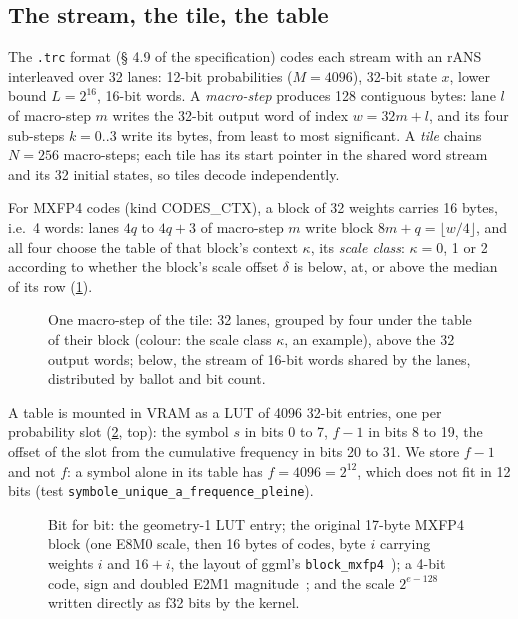 \subsection{The stream, the tile, the table}

The \texttt{.trc} format (§ 4.9 of the specification) codes each stream with an rANS interleaved over 32 lanes: 12-bit probabilities ($M = \num{4096}$), 32-bit state $x$, lower bound $L = 2^{16}$, 16-bit words. A \emph{macro-step} produces 128 contiguous bytes: lane $l$ of macro-step $m$ writes the 32-bit output word of index $w = 32m + l$, and its four sub-steps $k = 0..3$ write its bytes, from least to most significant. A \emph{tile} chains $N = 256$ macro-steps; each tile has its start pointer in the shared word stream and its 32 initial states, so tiles decode independently.

For MXFP4 codes (kind CODES\_CTX), a block of 32 weights carries 16 bytes, i.e.\ 4 words: lanes $4q$ to $4q+3$ of macro-step $m$ write block $8m + q = \lfloor w/4 \rfloor$, and all four choose the table of that block's context $\kappa$, its \emph{scale class}: $\kappa = 0$, 1 or 2 according to whether the block's scale offset $\delta$ is below, at, or above the median of its row (\cref{fig:t2n-tuile}).

\begin{figure}[!htbp]
\centering
\resizebox{\linewidth}{!}{\SchemaNoyTuile}
\caption[The rANS tile and the per-lane table]{One macro-step of the tile: 32 lanes, grouped by four under the table of their block (colour: the scale class $\kappa$, an example), above the 32 output words; below, the stream of 16-bit words shared by the lanes, distributed by ballot and bit count.}
\label{fig:t2n-tuile}
\end{figure}

A table is mounted in VRAM as a LUT of \num{4096} 32-bit entries, one per probability slot (\cref{fig:t2n-bits}, top): the symbol $s$ in bits 0 to 7, $f - 1$ in bits 8 to 19, the offset of the slot from the cumulative frequency in bits 20 to 31. We store $f - 1$ and not $f$: a symbol alone in its table has $f = \num{4096} = 2^{12}$, which does not fit in 12 bits (test \texttt{symbole\_\allowbreak unique\_\allowbreak a\_\allowbreak frequence\_\allowbreak pleine}).

\begin{figure}[!htbp]
\centering
\resizebox{\linewidth}{!}{\SchemaNoyBits}
\caption[The bits: LUT entry, MXFP4 block, code, E8M0 scale]{Bit for bit: the geometry-1 LUT entry; the original 17-byte MXFP4 block (one E8M0 scale, then 16 bytes of codes, byte $i$ carrying weights $i$ and $16 + i$, the layout of ggml's \texttt{block\_mxfp4}~\cite{ggml2026mxfp4}); a 4-bit code, sign and doubled E2M1 magnitude~\cite{ocpmx2023}; and the scale $2^{e-128}$ written directly as f32 bits by the kernel.}
\label{fig:t2n-bits}
\end{figure}

